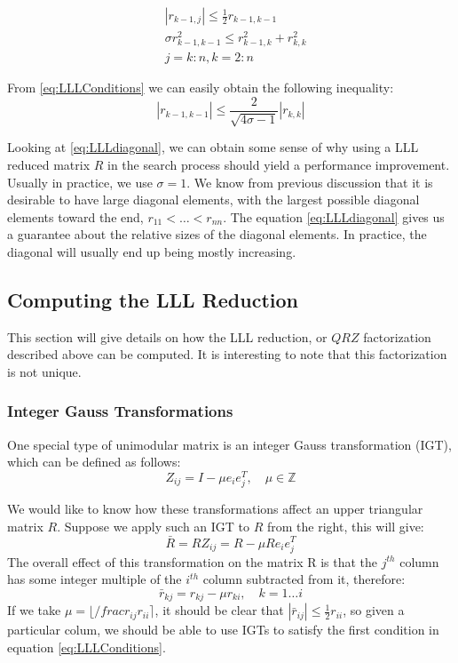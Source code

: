 \documentclass[12pt,Bold,letterpaper]{mcgilletdclass}
\begin{document}
\begin{align} \label{eq:LLLConditions}
&\left | r_{k-1,j} \right | \le \frac{1}{2}r_{k-1,k-1} \\
&\sigma r_{k-1,k-1}^2 \le r_{k-1,k}^2 + r_{k,k}^2 \\
&j = k:n, k=2:n
\end{align}

From \eqref{eq:LLLConditions} we can easily obtain the following inequality:
\begin{equation} \label{eq:LLLdiagonal}
\left | r_{k-1,k-1} \right | \le \frac{2}{\sqrt{4\sigma -1}}\left | r_{k,k} \right |
\end{equation}

Looking at \eqref{eq:LLLdiagonal}, we can obtain some sense of why using a LLL reduced matrix $R$ in the search process should yield a performance improvement. Usually in practice, we use $\sigma=1$. We know from previous discussion that it is desirable to have large diagonal elements, with the largest possible diagonal elements toward the end, $r_{11} < \dots < r_{nn}$. The equation \eqref{eq:LLLdiagonal} gives us a guarantee about the relative sizes of the diagonal elements. In practice, the diagonal will usually end up being mostly increasing.

\subsection{Computing the LLL Reduction}
This section will give details on how the LLL reduction, or $QRZ$ factorization described above can be computed. It is interesting to note that this factorization is not unique.

\subsubsection{Integer Gauss Transformations} \label{subsec:IGT}

One special type of unimodular matrix is an integer Gauss transformation (IGT), which can be defined as follows:
\begin{equation}
Z_{ij} = I-\mu e_ie_j^T, \quad \mu \in \mathbb{Z}
\end{equation}

We would like to know how these transformations affect an upper triangular matrix $R$. Suppose we apply such an IGT to $R$ from the right, this will give:
\begin{equation}
\bar{R} = RZ_{ij} = R - \mu Re_ie_j^T
\end{equation}
The overall effect of this transformation on the matrix R is that the $j^{th}$ column has some integer multiple of the $i^{th}$ column subtracted from it, therefore:
\begin{equation}
\bar{r}_{kj} = r_{kj} - \mu r_{ki}, \quad k=1 \dots i
\end{equation}
If we take $\mu = \lfloor /frac{r_{ij}}{r_{ii}} \rceil$, it should be clear that $|\bar{r}_{ij}| \le \frac{1}{2}r_{ii}$, so given a particular colum, we should be able to use IGTs to satisfy the first condition in equation \eqref{eq:LLLConditions}.
\end{document}

